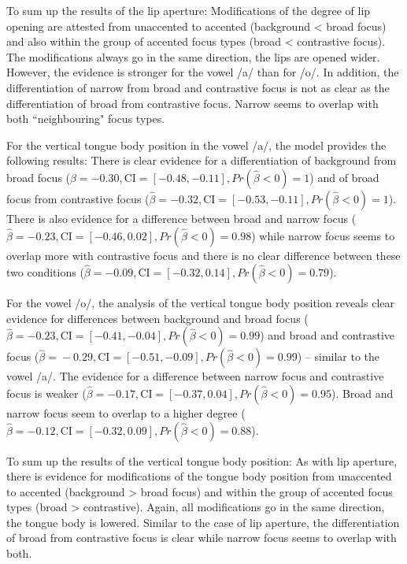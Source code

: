 To sum up the results of the lip aperture: Modifications of the degree of lip opening are attested from unaccented to accented (background < broad focus) and also within the group of accented focus types (broad < contrastive focus). The modifications always go in the same direction, the lips are opened wider. However, the evidence is stronger for the vowel /a/ than for /o/. In addition, the differentiation of narrow from broad and contrastive focus is not as clear as the differentiation of broad from contrastive focus. Narrow seems to overlap with both ``neighbouring" focus types.

For the vertical tongue body position in the vowel /a/, the model provides the following results: There is clear evidence for a differentiation of background from broad focus ($\hat\beta=-0.30 , \text{CI}=[-0.48, -0.11], \allowbreak Pr(\hat\beta<0)=1$) and of broad focus from contrastive focus ($\hat\beta=-0.32 , \text{CI}=[-0.53, -0.11], \allowbreak Pr(\hat\beta<0)=1$). There is also evidence for a difference between broad and narrow focus ($\hat\beta=-0.23 , \text{CI}=[-0.46, 0.02], \allowbreak Pr(\hat\beta<0)=0.98$) while narrow focus seems to overlap more with contrastive focus and there is no clear difference between these two conditions ($\hat\beta=-0.09 , \text{CI}=[-0.32, 0.14], \allowbreak Pr(\hat\beta<0)=0.79$).

For the vowel /o/, the analysis of the vertical tongue body position reveals clear evidence for differences between background and broad focus ($\hat\beta=-0.23, \text{CI}=[-0.41, -0.04], \allowbreak Pr(\hat\beta<0)=0.99$) and broad and contrastive focus ($\hat\beta\!=\!-0.29 , \text{CI}=[-0.51, -0.09], \allowbreak Pr(\hat\beta<0)=0.99$) -- similar to the vowel /a/. The evidence for a difference between narrow focus and contrastive focus is weaker ($\hat\beta=-0.17, \text{CI}=[-0.37, 0.04], \allowbreak Pr(\hat\beta<0)=0.95$). Broad and narrow focus seem to overlap to a higher degree ($\hat\beta=-0.12, \text{CI}=[-0.32, 0.09], \allowbreak Pr(\hat\beta<0)=0.88$).

To sum up the results of the vertical tongue body position: As with lip aperture, there is evidence for modifications of the tongue body position from unaccented to accented (background > broad focus) and within the group of accented focus types (broad > contrastive). Again, all modifications go in the same direction, the tongue body is lowered. Similar to the case of lip aperture, the differentiation of broad from contrastive focus is clear while narrow focus seems to overlap with both.

